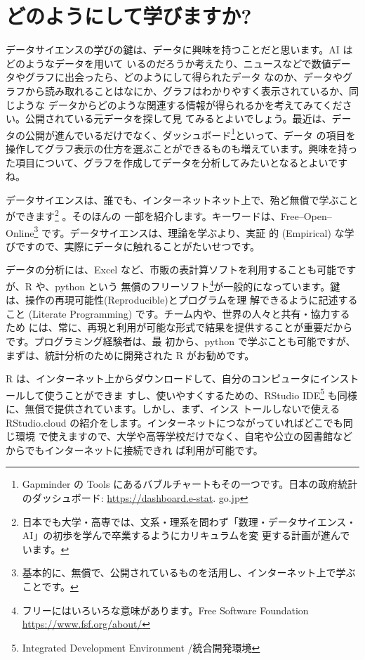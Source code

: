 \documentclass[
]{book}
\theoremstyle{definition}
\theoremstyle{definition}
\theoremstyle{definition}
\theoremstyle{definition}
\theoremstyle{remark}
\begin{document}
\hypertarget{ux3069ux306eux3088ux3046ux306bux3057ux3066ux5b66ux3073ux307eux3059ux304b}{%
\section{どのようにして学びますか?}\label{ux3069ux306eux3088ux3046ux306bux3057ux3066ux5b66ux3073ux307eux3059ux304b}}

データサイエンスの学びの鍵は、データに興味を持つことだと思います。AI はどのようなデータを用いて いるのだろうか考えたり、ニュースなどで数値データやグラフに出会ったら、どのようにして得られたデータ なのか、データやグラフから読み取れることはなにか、グラフはわかりやすく表示されているか、同じような データからどのような関連する情報が得られるかを考えてみてください。公開されている元データを探して見 てみるとよいでしょう。最近は、データの公開が進んでいるだけでなく、ダッシュボード\footnote{Gapminder の Tools にあるバブルチャートもその一つです。日本の政府統計のダッシュボード: \url{https://dashboard.e-stat}.
  go.jp}といって、データ の項目を操作してグラフ表示の仕方を選ぶことができるものも増えています。興味を持った項目について、グラフを作成してデータを分析してみたいとなるとよいですね。

データサイエンスは、誰でも、インターネットネット上で、殆ど無償で学ぶことができます\footnote{日本でも大学・高専では、文系・理系を問わず「数理・データサイエンス・AI」の初歩を学んで卒業するようにカリキュラムを変 更する計画が進んでいます。} 。そのほんの
一部を紹介します。キーワードは、Free--Open--Online\footnote{基本的に、無償で、公開されているものを活用し、インターネット上で学ぶことです。} です。データサイエンスは、理論を学ぶより、実証 的 (Empirical) な学びですので、実際にデータに触れることがたいせつです。

データの分析には、Excel など、市販の表計算ソフトを利用することも可能ですが、R や、python という 無償のフリーソフト\footnote{フリーにはいろいろな意味があります。Free Software Foundation \url{https://www.fsf.org/about/}}が一般的になっています。鍵は、操作の再現可能性(Reproducible)とプログラムを理 解できるように記述すること (Literate Programming) です。チーム内や、世界の人々と共有・協力するため には、常に、再現と利用が可能な形式で結果を提供することが重要だからです。プログラミング経験者は、最 初から、python で学ぶことも可能ですが、まずは、統計分析のために開発された R がお勧めです。

R は、インターネット上からダウンロードして、自分のコンピュータにインストールして使うことができま すし、使いやすくするための、RStudio IDE\footnote{Integrated Development Environment /統合開発環境} も同様に、無償で提供されています。しかし、まず、インス トールしないで使える RStudio.cloud の紹介をします。インターネットにつながっていればどこでも同じ環境 で使えますので、大学や高等学校だけでなく、自宅や公立の図書館などからでもインターネットに接続できれ ば利用が可能です。
\end{document}
